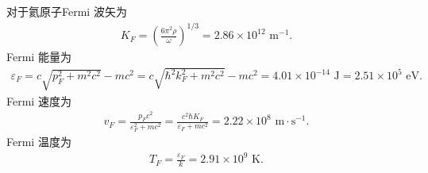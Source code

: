 \documentclass{assignment}
\begin{document}
\begin{sol}
\begin{itemize}
        对于氦原子Fermi 波矢为
        \begin{align}
            K_F=\left(\frac{6\pi^2\rho}{\omega}\right)^{1/3}=2.86\times 10^{12}\text{ m}^{-1}.
        \end{align}
        Fermi 能量为
        \begin{align}
            \varepsilon_F=c\sqrt{p_F^2+m^2c^2}-mc^2=c\sqrt{\hbar^2k_F^2+m^2c^2}-mc^2=4.01\times 10^{-14}\text{ J}=2.51\times 10^5\text{ eV}.
        \end{align}
        Fermi 速度为
        \begin{align}
            v_F=\frac{p_Fc^2}{\varepsilon_F^2+mc^2}=\frac{c^2\hbar K_F}{\varepsilon_F+mc^2}=2.22\times 10^8\text{ m}\cdot\text{s}^{-1}.
        \end{align}
        Fermi 温度为
        \begin{align}
            T_F=\frac{\varepsilon_F}{k}=2.91\times 10^9\text{ K}.
        \end{align}
    \end{itemize}
\end{sol}
\end{document}
